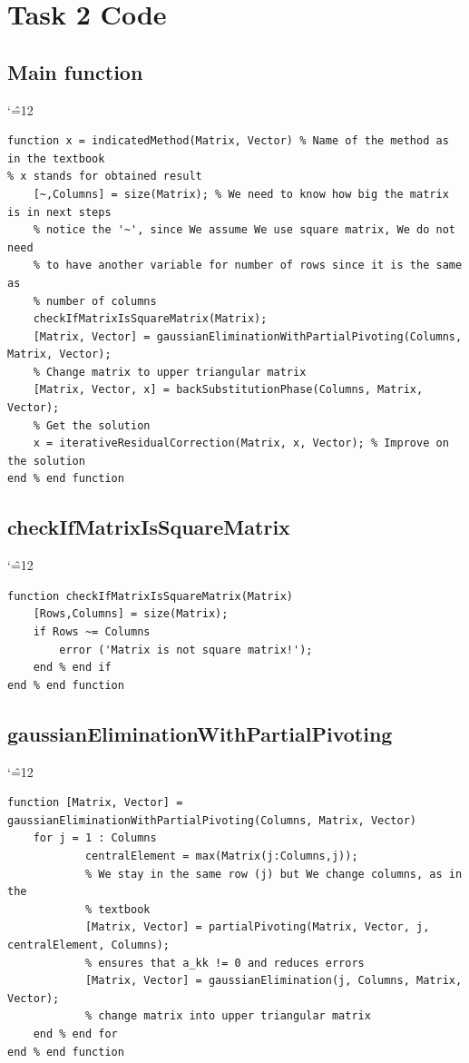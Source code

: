 \documentclass[12pt]{report}
\newenvironment{simplechar}{%
   \catcode`\^=12
}{}
\begin{document}
\section{Task 2 Code}

\subsection{Main function}
\begin{simplechar}
\begin{lstlisting}
function x = indicatedMethod(Matrix, Vector) % Name of the method as in the textbook
% x stands for obtained result
    [~,Columns] = size(Matrix); % We need to know how big the matrix is in next steps
    % notice the '~', since We assume We use square matrix, We do not need
    % to have another variable for number of rows since it is the same as
    % number of columns
    checkIfMatrixIsSquareMatrix(Matrix);
    [Matrix, Vector] = gaussianEliminationWithPartialPivoting(Columns, Matrix, Vector);
    % Change matrix to upper triangular matrix
    [Matrix, Vector, x] = backSubstitutionPhase(Columns, Matrix, Vector);
    % Get the solution
    x = iterativeResidualCorrection(Matrix, x, Vector); % Improve on the solution
end % end function
\end{lstlisting}
\end{simplechar}

\subsection{checkIfMatrixIsSquareMatrix}
\begin{simplechar}
\begin{lstlisting}
function checkIfMatrixIsSquareMatrix(Matrix)
    [Rows,Columns] = size(Matrix);
    if Rows ~= Columns
        error ('Matrix is not square matrix!');
    end % end if
end % end function
\end{lstlisting}
\end{simplechar}

\newpage
\subsection{gaussianEliminationWithPartialPivoting}
\begin{simplechar}
\begin{lstlisting}
function [Matrix, Vector] = gaussianEliminationWithPartialPivoting(Columns, Matrix, Vector)
    for j = 1 : Columns
            centralElement = max(Matrix(j:Columns,j));
            % We stay in the same row (j) but We change columns, as in the
            % textbook
            [Matrix, Vector] = partialPivoting(Matrix, Vector, j, centralElement, Columns);
            % ensures that a_kk != 0 and reduces errors
            [Matrix, Vector] = gaussianElimination(j, Columns, Matrix, Vector);
            % change matrix into upper triangular matrix
    end % end for
end % end function
\end{lstlisting}
\end{simplechar}
\end{document}
